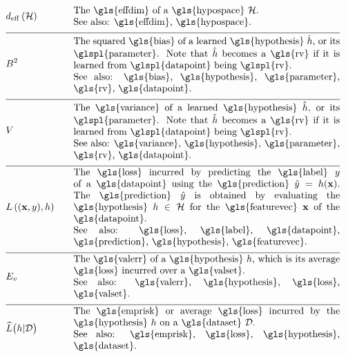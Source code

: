 \begin{align}
	&\effdim{\hypospace}  &\quad & \parbox{.80\textwidth}{The \gls{effdim} of a \gls{hypospace} $\hypospace$.
		\\ See also: \gls{effdim}, \gls{hypospace}. }   \nonumber \\[2mm] \hline \nonumber\\[-5mm]
	&\biasterm^2 &\quad &\parbox{.80\textwidth}{
		The squared \gls{bias} of a learned \gls{hypothesis} $\learnthypothesis$, or its \glspl{parameter}. Note that $\learnthypothesis$ 
		becomes a \gls{rv} if it is learned from \glspl{datapoint} being \glspl{rv}.
		\\ See also: \gls{bias}, \gls{hypothesis}, \gls{parameter}, \gls{rv}, \gls{datapoint}. } \nonumber  \nonumber \\[2mm] \hline \nonumber\\[-5mm]
	&\varianceterm &\quad &\parbox{.80\textwidth}{The \gls{variance} of a learned 
	  	\gls{hypothesis} $\learnthypothesis$, or its \glspl{parameter}. Note that $\learnthypothesis$ 
	  	becomes a \gls{rv} if it is learned from \glspl{datapoint} being \glspl{rv}.
		\\ See also: \gls{variance}, \gls{hypothesis}, \gls{parameter}, \gls{rv}, \gls{datapoint}. } \nonumber \nonumber \\[2mm] \hline \nonumber\\[-5mm]
	&\lossfunc{(\featurevec,\truelabel)}{\hypothesis}  &\quad & \parbox{.80\textwidth}{The \gls{loss} incurred by predicting the 
		\gls{label} $\truelabel$ of a \gls{datapoint} using the \gls{prediction} $\hat{\truelabel}=h(\featurevec)$. The 
		\gls{prediction} $\hat{\truelabel}$ is obtained by evaluating the \gls{hypothesis} $\hypothesis \in \hypospace$ for 
		the \gls{featurevec} $\featurevec$ of the \gls{datapoint}.
		\\ See also: \gls{loss}, \gls{label}, \gls{datapoint}, \gls{prediction}, \gls{hypothesis}, 
		\gls{featurevec}. }    \nonumber  \nonumber \\[2mm] \hline \nonumber\\[-5mm] 
	&\valerror &\quad &\parbox{.80\textwidth}{The \gls{valerr} of a \gls{hypothesis} $\hypothesis$, which is its 
		average \gls{loss} incurred over a \gls{valset}.
		\\ See also: \gls{valerr}, \gls{hypothesis}, \gls{loss}, \gls{valset}. }  \nonumber \\[2mm] \hline \nonumber\\[-5mm]
	&\emperror\big(\hypothesis| \dataset \big) &\quad &\parbox{.80\textwidth}{The \gls{emprisk} or average \gls{loss} 
		incurred by the \gls{hypothesis} $\hypothesis$ on a \gls{dataset} $\dataset$.
		\\ See also: \gls{emprisk}, \gls{loss}, \gls{hypothesis}, \gls{dataset}. } \nonumber 
\end{align}     

